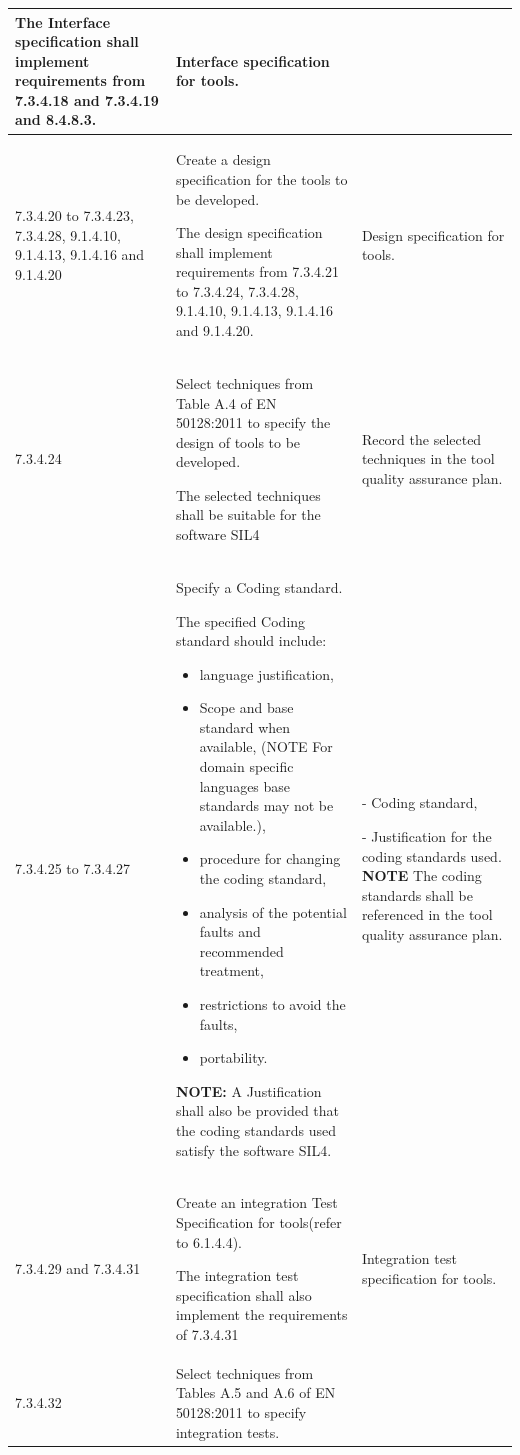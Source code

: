 \documentclass{template/openetcs_report}
\begin{document}
{\begin{longtable}{|p{2cm}|p{9cm}|p{3cm}|}
The Interface specification shall implement requirements from 7.3.4.18 and 7.3.4.19 and 8.4.8.3.
& Interface specification for tools.\\ 
\hline
7.3.4.20 to 7.3.4.23, 7.3.4.28, 9.1.4.10, 9.1.4.13, 9.1.4.16 and 9.1.4.20
& Create a design specification for the tools to be developed.

The design specification shall implement requirements from 7.3.4.21 to 7.3.4.24, 7.3.4.28, 9.1.4.10, 9.1.4.13, 9.1.4.16 and 9.1.4.20.
& Design specification for tools.\\ 
\hline
7.3.4.24 & Select techniques from Table A.4 of EN 50128:2011 to specify the design of tools to be developed. 

The selected techniques shall be suitable for the software SIL4
& Record the selected techniques in the tool quality assurance plan.\\ 
\hline
7.3.4.25 to 7.3.4.27 & 
Specify a Coding standard.

The specified Coding standard should include:
\begin{itemize}\itemsep=0pt
  \item language justification,
  \item Scope and base standard when available, (NOTE For domain specific languages base standards may not be available.),
  \item procedure for changing the coding standard,
  \item analysis of the potential faults and recommended treatment,
  \item restrictions to avoid the faults,
  \item portability.
\end{itemize}

\textbf{NOTE:}\linebreak
A Justification shall also be provided that the coding standards used satisfy the software SIL4.
& 
- Coding standard,

- Justification for the coding standards used.
\linebreak
\linebreak
\textbf{NOTE}\linebreak
The coding standards shall be referenced in the tool quality assurance plan.\\ 
\hline
7.3.4.29 and 7.3.4.31 & Create an integration Test Specification for tools(refer to 6.1.4.4).

The integration test specification shall also implement the requirements of 7.3.4.31
& Integration test specification for tools.\\ 
\hline
7.3.4.32 & Select techniques from Tables A.5 and A.6 of EN 50128:2011 to specify integration tests. 


\end{longtable}}
\end{document}

